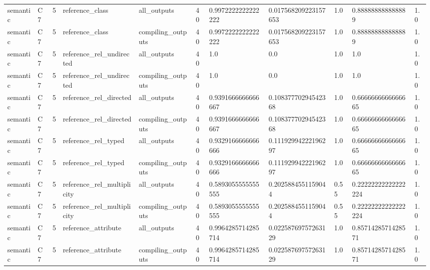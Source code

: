 \begin{tabular}{lllllllllll}
semantic & C7 & 5 & reference\_class & all\_outputs & 40 & 0.9972222222222222 & 0.017568209223157653 & 1.0 & 0.888888888888889 & 1.0 \\
semantic & C7 & 5 & reference\_class & compiling\_outputs & 40 & 0.9972222222222222 & 0.017568209223157653 & 1.0 & 0.888888888888889 & 1.0 \\
semantic & C7 & 5 & reference\_rel\_undirected & all\_outputs & 40 & 1.0 & 0.0 & 1.0 & 1.0 & 1.0 \\
semantic & C7 & 5 & reference\_rel\_undirected & compiling\_outputs & 40 & 1.0 & 0.0 & 1.0 & 1.0 & 1.0 \\
semantic & C7 & 5 & reference\_rel\_directed & all\_outputs & 40 & 0.9391666666666667 & 0.10837770294542368 & 1.0 & 0.6666666666666665 & 1.0 \\
semantic & C7 & 5 & reference\_rel\_directed & compiling\_outputs & 40 & 0.9391666666666667 & 0.10837770294542368 & 1.0 & 0.6666666666666665 & 1.0 \\
semantic & C7 & 5 & reference\_rel\_typed & all\_outputs & 40 & 0.9329166666666666 & 0.11192994222196297 & 1.0 & 0.6666666666666665 & 1.0 \\
semantic & C7 & 5 & reference\_rel\_typed & compiling\_outputs & 40 & 0.9329166666666666 & 0.11192994222196297 & 1.0 & 0.6666666666666665 & 1.0 \\
semantic & C7 & 5 & reference\_rel\_multiplicity & all\_outputs & 40 & 0.5893055555555555 & 0.2025884551159044 & 0.55 & 0.22222222222222224 & 1.0 \\
semantic & C7 & 5 & reference\_rel\_multiplicity & compiling\_outputs & 40 & 0.5893055555555555 & 0.2025884551159044 & 0.55 & 0.22222222222222224 & 1.0 \\
semantic & C7 & 5 & reference\_attribute & all\_outputs & 40 & 0.9964285714285714 & 0.02258769757263129 & 1.0 & 0.8571428571428571 & 1.0 \\
semantic & C7 & 5 & reference\_attribute & compiling\_outputs & 40 & 0.9964285714285714 & 0.02258769757263129 & 1.0 & 0.8571428571428571 & 1.0 \\
\end{tabular}